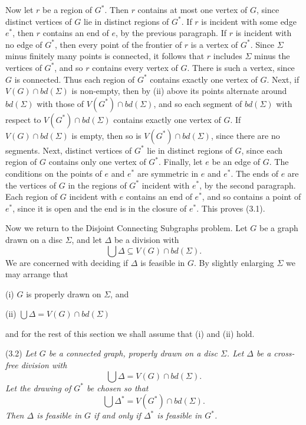{Now let $r$ be a region of $G^*$. Then $r$ contains at most one vertex of $G$, since distinct
vertices of $G$ lie in distinct regions of $G^*$. If $r$ is incident with some edge $e^*$, then $r$
contains an end of $e$, by the previous paragraph. If $r$ is incident with no edge of $G^*$, then
every point of the frontier of $r$ is a vertex of $G^*$. Since $\Sigma$ minus finitely many points is
connected, it follows that $r$ includes $\Sigma$ minus the vertices of $G^*$, and so $r$ contains
every vertex of $G$. There is such a vertex, since $G$ is connected. Thus each region of $G^*$
contains exactly one vertex of $G$. Next, if $V(G) \cap bd(\Sigma)$ is non-empty, then by (ii) above
its points alternate around $bd(\Sigma)$ with those of $V(G^*) \cap bd(\Sigma)$, and so each segment
of $bd(\Sigma)$ with respect to $V(G^*) \cap bd(\Sigma)$ contains exactly one vertex of $G$. If
$V(G) \cap bd(\Sigma)$ is empty, then so is $V(G^*) \cap bd(\Sigma)$, since there are no segments.
Next, distinct vertices of $G^*$ lie in distinct regions of $G$, since each region of $G$ contains
only one vertex of $G^*$. Finally, let $e$ be an edge of $G$. The conditions on the points of $e$ and
$e^*$ are symmetric in $e$ and $e^*$. The ends of $e$ are the vertices of $G$ in the regions of $G^*$
incident with $e^*$, by the second paragraph. Each region of $G$ incident with $e$ contains an end of
$e^*$, and so contains a point of $e^*$, since it is open and the end is in the closure of $e^*$.
This proves (3.1).}

Now we return to the Disjoint Connecting Subgraphs problem. Let $G$ be a graph drawn on a disc $\Sigma$, and let $\Delta$ be a division with
\begin{equation*}
\bigcup \Delta \subseteq V(G) \cap bd(\Sigma).
\end{equation*}
We are concerned with deciding if $\Delta$ is feasible in $G$. By slightly enlarging $\Sigma$ we may arrange that

\hspace*{12pt}(i) $G$ is properly drawn on $\Sigma$, and

\hspace*{12pt}(ii) $\bigcup \Delta = V(G) \cap bd(\Sigma)$

and for the rest of this section we shall assume that (i) and (ii) hold.

\stmt
(3.2) \textit{Let $G$ be a connected graph, properly drawn on a disc $\Sigma$. Let $\Delta$ be a cross-free division with}
\begin{equation*}
\bigcup \Delta = V(G) \cap bd(\Sigma).
\end{equation*}
\textit{Let the drawing of $G^*$ be chosen so that}
\begin{equation*}
\bigcup \Delta^* = V(G^*) \cap bd(\Sigma).
\end{equation*}
\textit{Then $\Delta$ is feasible in $G$ if and only if $\Delta^*$ is feasible in $G^*$.}

